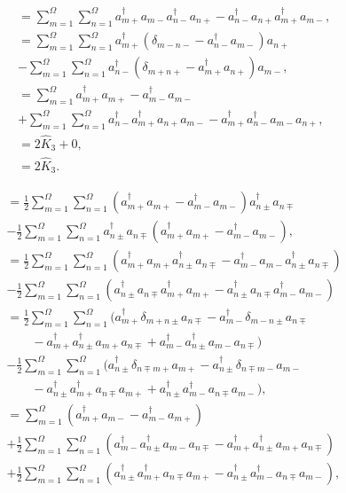 \documentclass[
a4paper,
10pt,
twoside,
]{article}
\begin{document}
\begin{align}
	[\hat{K}_+,\hat{K}_-]
		&= \sum_{m=1}^\Omega\sum_{n=1}^\Omega a_{m+}^\dagger a_{m-} a_{n-}^\dagger a_{n+} - a_{n-}^\dagger a_{n+} a_{m+}^\dagger a_{m-},\\
		&= \sum_{m=1}^\Omega\sum_{n=1}^\Omega a_{m+}^\dagger (\delta_{m-n-} - a_{n-}^\dagger a_{m-}) a_{n+}\nonumber\\
		&- \sum_{m=1}^\Omega\sum_{n=1}^\Omega a_{n-}^\dagger (\delta_{m+n+} - a_{m+}^\dagger a_{n+}) a_{m-},\\
		&= \sum_{m=1}^\Omega a_{m+}^\dagger a_{m+} - a_{m-}^\dagger a_{m-}\nonumber\\
		&+ \sum_{m=1}^\Omega\sum_{n=1}^\Omega a_{n-}^\dagger a_{m+}^\dagger a_{n+} a_{m-} - a_{m+}^\dagger a_{n-}^\dagger a_{m-} a_{n+},\\
		&= 2\hat{K}_3 + 0,\\
		&= 2\hat{K}_3.
\end{align}

\begin{align}
	[\hat{K}_3,\hat{K}_\pm]
		&= \frac{1}{2} \sum_{m=1}^\Omega\sum_{n=1}^\Omega (a_{m+}^\dagger a_{m+}-a_{m-}^\dagger a_{m-}) a_{n\pm}^\dagger a_{n\mp} \nonumber\\
		&- \frac{1}{2} \sum_{m=1}^\Omega\sum_{n=1}^\Omega a_{n\pm}^\dagger a_{n\mp} (a_{m+}^\dagger a_{m+}-a_{m-}^\dagger a_{m-}),\\
		&= \frac{1}{2} \sum_{m=1}^\Omega\sum_{n=1}^\Omega (a_{m+}^\dagger a_{m+} a_{n\pm}^\dagger a_{n\mp} - a_{m-}^\dagger a_{m-} a_{n\pm}^\dagger a_{n\mp}) \nonumber\\
		&- \frac{1}{2} \sum_{m=1}^\Omega\sum_{n=1}^\Omega (a_{n\pm}^\dagger a_{n\mp} a_{m+}^\dagger a_{m+} - a_{n\pm}^\dagger a_{n\mp} a_{m-}^\dagger a_{m-})\\
		&= \frac{1}{2} \sum_{m=1}^\Omega\sum_{n=1}^\Omega (a_{m+}^\dagger \delta_{m+n\pm} a_{n\mp} - a_{m-}^\dagger \delta_{m-n\pm} a_{n\mp} \nonumber\\
		&\qquad - a_{m+}^\dagger a_{n\pm}^\dagger a_{m+} a_{n\mp} + a_{m-}^\dagger a_{n\pm}^\dagger a_{m-} a_{n\mp}) \nonumber\\
		&- \frac{1}{2} \sum_{m=1}^\Omega\sum_{n=1}^\Omega (a_{n\pm}^\dagger \delta_{n\mp m+} a_{m+} - a_{n\pm}^\dagger \delta_{n\mp m-}a_{m-} \nonumber\\
		&\qquad - a_{n\pm}^\dagger a_{m+}^\dagger a_{n\mp} a_{m+} + a_{n\pm}^\dagger a_{m-}^\dagger a_{n\mp} a_{m-}),\\
		&= \sum_{m=1}^\Omega (a_{m+}^\dagger a_{m-} - a_{m-}^\dagger a_{m+}) \nonumber\\
		&+ \frac{1}{2} \sum_{m=1}^\Omega\sum_{n=1}^\Omega (a_{m-}^\dagger a_{n\pm}^\dagger a_{m-} a_{n\mp} - a_{m+}^\dagger a_{n\pm}^\dagger a_{m+} a_{n\mp}) \nonumber\\
		&+ \frac{1}{2} \sum_{m=1}^\Omega\sum_{n=1}^\Omega (a_{n\pm}^\dagger a_{m+}^\dagger a_{n\mp} a_{m+} - a_{n\pm}^\dagger a_{m-}^\dagger a_{n\mp} a_{m-}),
\end{align}

\stopmcols
\end{document}

